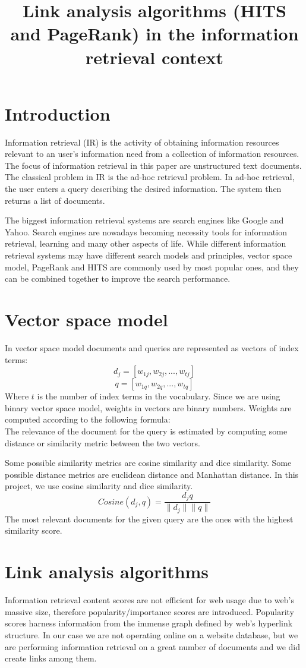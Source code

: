 \documentclass[10pt, a4paper]{article}
\title{Link analysis algorithms (HITS and PageRank) in the information retrieval context}
\begin{document}
\maketitleabstract

\section{Introduction}
Information retrieval (IR) is the activity of obtaining information resources relevant to an user’s information need from a collection of information resources. The focus of information retrieval in this paper are unstructured text documents. The classical problem in IR is the ad-hoc retrieval problem. In ad-hoc retrieval, the user enters a query describing the desired information. The system then returns a list of documents.

The biggest information retrieval systems are search engines like Google and Yahoo. Search engines are nowadays becoming necessity tools for information retrieval, learning and many other aspects of life. While different information retrieval systems may have different search models and principles, vector space model, PageRank and HITS are commonly used by most popular ones, and they can be combined together to improve the search performance.

\section{Vector space model}
In vector space model documents and queries are represented as vectors of index terms:
$$d_j = [w_{1j}, w_{2j},..., w_{tj}]$$
$$q = [w_{1q}, w_{2q},..., w_{tq}]$$
Where $t$ is the number of index terms in the vocabulary. Since we are using binary vector space model, weights in vectors are binary numbers. Weights are computed according to the following formula:
$$$$
The relevance of the document for the query is estimated by computing some distance or similarity metric between the two vectors.

Some possible similarity metrics are cosine similarity and dice similarity. Some possible distance metrics are euclidean distance and Manhattan distance. In this project, we use cosine similarity and dice similarity.
$$Cosine(d_j, q) = \frac{d_j q}{\lVert d_j \rVert \lVert q \rVert}$$
The most relevant documents for the given query are the ones with the highest similarity score.

\section{Link analysis algorithms} \label{linkovi}
Information retrieval content scores are not efficient for web usage due to web's massive size, therefore popularity/importance scores are introduced. Popularity scores harness information from the immense graph defined by web's hyperlink structure. In our case we are not operating online on a website database, but we are performing information retrieval on a great number of documents and we did create links among them. 
\end{document}
